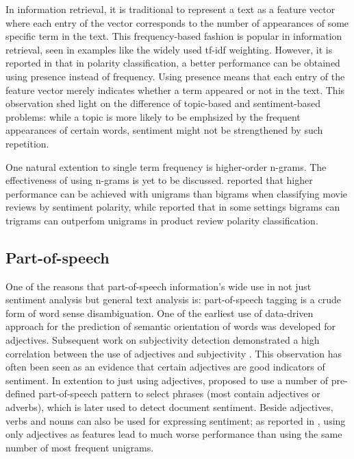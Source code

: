 In information retrieval, it is traditional to represent a text as a feature vector where each entry of the vector corresponds to the number of appearances of some specific term in the text. This frequency-based fashion is popular in information retrieval, seen in examples like the widely used tf-idf weighting. However, it is reported in \cite{pang2002thumbs} that in polarity classification, a better performance can be obtained using presence instead of frequency. Using presence means that each entry of the feature vector merely indicates whether a term appeared or not in the text. This observation shed light on the difference of topic-based and sentiment-based problems: while a topic is more likely to be emphsized by the frequent appearances of certain words, sentiment might not be strengthened by such repetition. 

One natural extention to single term frequency is higher-order n-grams. The effectiveness of using n-grams is yet to be discussed. \cite{pang2002thumbs} reported that higher performance can be achieved with unigrams than bigrams when classifying movie reviews by sentiment polarity, whilc \cite{dave2003mining} reported that in some settings bigrams can trigrams can outperfom unigrams in product review polarity classification.

\subsection{Part-of-speech}

One of the reasons that part-of-speech information's wide use in not just sentiment analysis but general text analysis is: part-of-speech tagging is a crude form of word sense disambiguation. One of the earliest use of data-driven approach for the prediction of semantic orientation of words was developed for adjectives. Subsequent work on subjectivity detection demonstrated a high correlation between the use of adjectives and subjectivity \cite{hatzivassiloglou2000effects}. This observation has often been seen as an evidence that certain adjectives are good indicators of sentiment. In extention to just using adjectives, \cite{turney2002thumbs} proposed to use a number of pre-defined part-of-speech pattern to select phrases (most contain adjectives or adverbs), which is later used to detect document sentiment. Beside adjectives, verbs and nouns can also be used for expressing sentiment; as reported in \cite{pang2002thumbs}, using only adjectives as features lead to much worse performance than using the same number of most frequent unigrams. 

